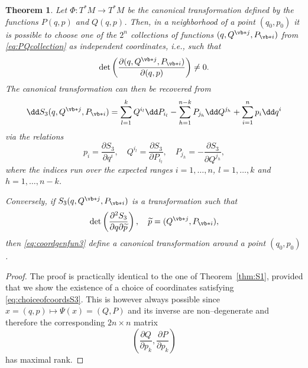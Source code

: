 \documentclass[english,fontsize=11pt,paper=b5]{scrbook}
\numberwithin{equation}{chapter}
\newtheorem{theorem}{Theorem}[chapter]
\theoremstyle{definition}
\begin{document}
    \begin{theorem}
      Let $\Phi:T^*M \to T^* M$ be the canonical transformation defined by the functions $P(q,p)$ and $Q(q,p)$.
      Then, in a neighborhood of a point $(q_0, p_0)$ it is possible to choose one of the $2^n$ collections of functions $(q, Q^{\vb* j}, P_{\vb* i})$ from \eqref{eq:PQcollection} as independent coordinates, i.e., such that
      \begin{equation}\label{eq:choiceofcoordsS3}
        \det\left(\frac{\partial (q, Q^{\vb* j}, P_{\vb* i})}{\partial(q,p)}\right) \neq 0.
      \end{equation}
      The canonical transformation can then be recovered from
      \begin{equation}
        \dd S_3(q, Q^{\vb* j}, P_{\vb* i}) = \sum_{l=1}^k Q^{i_l} \dd P_{i_l} -\sum_{h=1}^{n-k} P_{j_h} \dd Q^{j_h} + \sum_{i=1}^n p_i \dd q^i
      \end{equation}
      via the relations
      \begin{equation}\label{eq:coordgenfun3}
        p_i = \frac{\partial S_3}{\partial q^i}, \quad
        Q^{i_l} = \frac{\partial S_3}{\partial P_{i_l}}, \quad
        P_{j_h} = -\frac{\partial S_3}{\partial Q^{j_h}},
      \end{equation}
      where the indices run over the expected ranges $i=1,\ldots,n$, $l=1,\ldots,k$ and $h = 1,\ldots,n-k$.

      Conversely, if $S_3(q, Q^{\vb* j}, P_{\vb* i})$ is a transformation such that
      \begin{equation}
        \det\left(\frac{\partial^2 S_3}{\partial q \partial \widetilde p}\right), \quad \widetilde p = (Q^{\vb* j}, P_{\vb* i}),
      \end{equation}
      then \eqref{eq:coordgenfun3} define a canonical transformation around a point $(q_0, p_0)$.
    \end{theorem}

    \begin{proof}
      The proof is practically identical to the one of Theorem~\ref{thm:S1}, provided that we show the existence of a choice of coordinates satisfying \eqref{eq:choiceofcoordsS3}.
      This is however always possible since $x=(q,p) \mapsto \Psi(x) = (Q,P)$ and its inverse are non--degenerate and therefore the corresponding $2n\times n$ matrix
      \begin{equation}
        \left(\frac{\partial Q}{\partial p_k}, \frac{\partial P}{\partial p_k}\right)
      \end{equation}
      has maximal rank.
    \end{proof}
\end{document}
